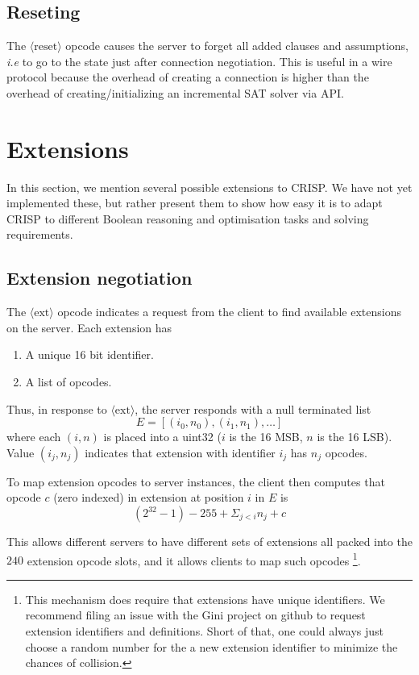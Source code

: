\documentclass{article}
\newcommand\proto[1]{$\langle\mbox{#1}\rangle$}
\begin{document}
\subsection{Reseting}
The \proto{reset} opcode causes the server to forget all added clauses and assumptions,
{\em i.e} to go to the state just after connection negotiation.  This is useful
in a wire protocol because the overhead of creating a connection is higher than
the overhead of creating/initializing an incremental SAT solver via API.

\section{Extensions}
\label{section:ext}
In this section, we mention several possible extensions to CRISP.  We have 
not yet implemented these, but rather present them to show how easy it 
is to adapt CRISP to different Boolean reasoning and optimisation tasks 
and solving requirements.

\subsection{Extension negotiation}
The \proto{ext} opcode indicates a request from the client to find
available extensions on the server.  Each extension has 
\begin{enumerate}
	\item A unique 16 bit identifier.
	\item A list of opcodes.
\end{enumerate}

Thus, in response to \proto{ext}, the server responds with a null terminated list 
\[
	E = [(i_0, n_0), (i_1, n_1), \ldots]
\]
where each $(i,n)$ is placed into a uint32 ($i$ is the 16 MSB, $n$ is the 16 LSB).  
Value $(i_j, n_j)$ indicates that extension with identifier $i_j$ has $n_j$ opcodes.

To map extension opcodes to server instances, the client then computes that opcode
$c$ (zero indexed) in extension at position $i$ in $E$ is
\[
	(2^{32}-1) - 255 + \Sigma_{j<i} n_j + c
\]

This allows different servers to have different sets of extensions all packed into
the $240$ extension opcode slots, and it allows clients to map such opcodes
\footnote{This mechanism does require that extensions have unique identifiers.  We recommend
filing an issue with the Gini project on github to request extension identifiers 
and definitions.  Short of that, one could always just choose a random number for the
a new extension identifier to minimize the chances of collision.}.
\end{document}
